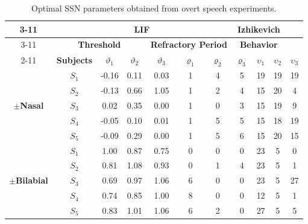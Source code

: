 \begin{table}[h!]
	\centering
	\caption{Optimal SSN parameters obtained from overt speech experiments.}
	\begin{tabular}{|*{11}{c|}}
		\cline{3-11}
		\multicolumn{2}{c|}{\multirow{1}{*}} & \multicolumn{6}{c|}{\textbf{LIF}} & \multicolumn{3}{c|}{\textbf{Izhikevich}} \\\cline{3-11}
		\multicolumn{2}{c|}{\multirow{1}{*}} & \multicolumn{3}{c|}{\textbf{Threshold}} & \multicolumn{3}{c|}{\textbf{Refractory Period}} & \multicolumn{3}{c|}{\textbf{Behavior}} \\\cline{2-11}
		\multicolumn{1}{c|}{\multirow{1}{*}} & \textbf{Subjects} & \multicolumn{1}{c|}{\boldmath$\vartheta_{1}$} & \multicolumn{1}{c|}{\boldmath$\vartheta_{2}$} & \multicolumn{1}{c|}{\boldmath$\vartheta_{3}$} & \multicolumn{1}{c|}{\boldmath$\varrho_{1}$} & \multicolumn{1}{c|}{\boldmath$\varrho_{2}$} & \multicolumn{1}{c|}{\boldmath$\varrho_{3}$} & \multicolumn{1}{c|}{\boldmath$\upsilon_{1}$} & \multicolumn{1}{c|}{\boldmath$\upsilon_{2}$} & \multicolumn{1}{c|}{\boldmath$\upsilon_{3}$} \\\hline
		\multirow{5}{*}{\begin{sideways}\boldmath$\pm$\textbf{Nasal}\end{sideways}} & \boldmath$S_{1}$ & -0.16 & 0.11  & 0.03  & 1     & 4     & 5     & 19    & 19    & 19 \\\cline{2-11}
		& \boldmath$S_{2}$ & -0.13 & 0.66  & 1.05  & 1     & 2     & 4     & 15    & 20    & 4 \\\cline{2-11}
		& \boldmath$S_{3}$ & 0.02  & 0.35  & 0.00  & 1     & 0     & 3     & 15    & 19    & 9 \\\cline{2-11}
		& \boldmath$S_{4}$ & -0.05 & 0.10  & 0.01  & 1     & 5     & 5     & 15    & 18    & 19 \\\cline{2-11}
		& \boldmath$S_{5}$ & -0.09 & 0.29  & 0.00  & 1     & 5     & 6     & 15    & 20    & 15 \\\hline
		\multirow{5}{*}{\begin{sideways}\boldmath$\pm$\textbf{Bilabial}\end{sideways}} & \boldmath$S_{1}$ & 1.00  & 0.87  & 0.75  & 0     & 0    & 0     & 23    & 5     & 0 \\\cline{2-11}
		& \boldmath$S_{2}$ & 0.81  & 1.08  & 0.93  & 0     & 1     & 4     & 23    & 5     & 1 \\\cline{2-11}
		& \boldmath$S_{3}$ & 0.69  & 0.97  & 1.06  & 6     & 0     & 0     & 23    & 5     & 27 \\\cline{2-11}
		& \boldmath$S_{4}$ & 0.74  & 0.85  & 1.00  & 8     & 0     & 0     & 12    & 5     & 1 \\\cline{2-11}
		& \boldmath$S_{5}$ & 0.83  & 1.01  & 1.06  & 6     & 2     & 0    & 27    & 5     & 5 \\\hline
	\end{tabular}%
	\label{Table: SSN_Optimal_Overt}%
\end{table}%

